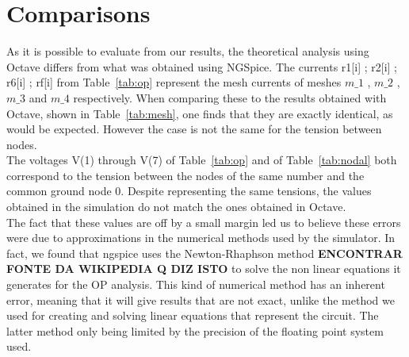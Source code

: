 \section{Comparisons}
\label{sec:comparisons}

As it is possible to evaluate from our results, the theoretical analysis using Octave differs from what was obtained using NGSpice. The currents r1[i] ; r2[i] ; r6[i] ; rf[i] from Table~\ref{tab:op} represent the mesh currents of meshes $m\_1$ , $m\_2$ , $m\_3$ and $m\_4$ respectively. When comparing these to the results obtained with Octave, shown in Table~\ref{tab:mesh}, one finds that they are exactly identical, as would be expected. However the case is not the same for the tension between nodes.\\
The voltages V(1) through V(7) of Table~\ref{tab:op} and of Table~\ref{tab:nodal} both correspond to the tension between the nodes of the same number and the common ground node 0. Despite representing the same tensions, the values obtained in the simulation do not match the ones obtained in Octave.\\
The fact that these values are off by a small margin led us to believe these errors were due to approximations in the numerical methods used by the simulator. In fact, we found that ngspice uses the Newton-Rhaphson method \textbf{ENCONTRAR FONTE DA WIKIPEDIA Q DIZ ISTO} to solve the non linear equations it generates for the OP analysis. This kind of numerical method has an inherent error, meaning that it will give results that are not exact, unlike the method we used for creating and solving linear equations that represent the circuit. The latter method only being limited by the precision of the floating point system used.
